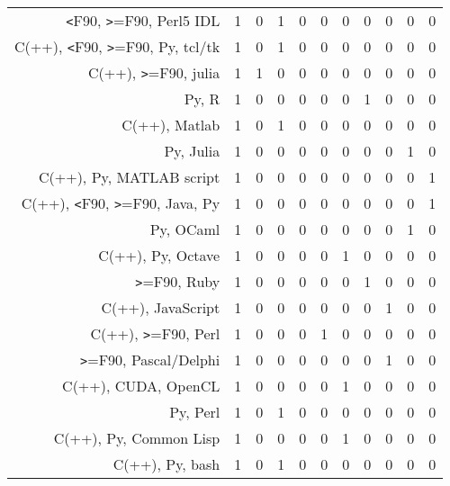 {\begin{landscape}
\begin{longtable}[htb]{r|c|c|c|c|c|c|c|c|c|c}
{\verb!<!F90, \verb!>!=F90, Perl5 IDL} & 1 & 0 & 1 & 0 & 0 & 0 & 0 & 0 & 0 & 0 \\%
{C(++), \verb!<!F90, \verb!>!=F90, Py, tcl/tk} & 1 & 0 & 1 & 0 & 0 & 0 & 0 & 0 & 0 & 0 \\%
{C(++), \verb!>!=F90, julia} & 1 & 1 & 0 & 0 & 0 & 0 & 0 & 0 & 0 & 0 \\%
{Py, R} & 1 & 0 & 0 & 0 & 0 & 0 & 1 & 0 & 0 & 0 \\%
{C(++), Matlab} & 1 & 0 & 1 & 0 & 0 & 0 & 0 & 0 & 0 & 0 \\%
{Py, Julia} & 1 & 0 & 0 & 0 & 0 & 0 & 0 & 0 & 1 & 0 \\%
{C(++), Py, MATLAB script} & 1 & 0 & 0 & 0 & 0 & 0 & 0 & 0 & 0 & 1 \\%
{C(++), \verb!<!F90, \verb!>!=F90, Java, Py} & 1 & 0 & 0 & 0 & 0 & 0 & 0 & 0 & 0 & 1 \\%
{Py, OCaml} & 1 & 0 & 0 & 0 & 0 & 0 & 0 & 0 & 1 & 0 \\%
{C(++), Py, Octave} & 1 & 0 & 0 & 0 & 0 & 1 & 0 & 0 & 0 & 0 \\%
{\verb!>!=F90, Ruby} & 1 & 0 & 0 & 0 & 0 & 0 & 1 & 0 & 0 & 0 \\%
{C(++), JavaScript} & 1 & 0 & 0 & 0 & 0 & 0 & 0 & 1 & 0 & 0 \\%
{C(++), \verb!>!=F90, Perl} & 1 & 0 & 0 & 0 & 1 & 0 & 0 & 0 & 0 & 0 \\%
{\verb!>!=F90, Pascal/Delphi} & 1 & 0 & 0 & 0 & 0 & 0 & 0 & 1 & 0 & 0 \\%
{C(++), CUDA, OpenCL} & 1 & 0 & 0 & 0 & 0 & 1 & 0 & 0 & 0 & 0 \\%
{Py, Perl} & 1 & 0 & 1 & 0 & 0 & 0 & 0 & 0 & 0 & 0 \\%
{C(++), Py, Common Lisp} & 1 & 0 & 0 & 0 & 0 & 1 & 0 & 0 & 0 & 0 \\%
{C(++), Py, bash} & 1 & 0 & 1 & 0 & 0 & 0 & 0 & 0 & 0 & 0 \\%
\hline%
\end{longtable}%
\end{landscape}}%
\clearpage%
